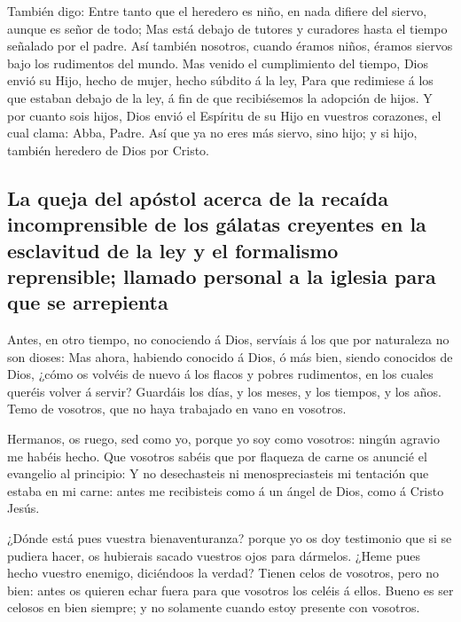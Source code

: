 También digo: Entre tanto que el heredero es niño, en
nada difiere del siervo, aunque es señor de todo;  Mas
está debajo de tutores y curadores hasta el tiempo señalado por el
padre.  Así también nosotros, cuando éramos niños, éramos
siervos bajo los rudimentos del mundo.  Mas venido el
cumplimiento del tiempo, Dios envió su Hijo, hecho de mujer, hecho
súbdito á la ley,  Para que redimiese á los que estaban
debajo de la ley, á fin de que recibiésemos la adopción de hijos.
 Y por cuanto sois hijos, Dios envió el Espíritu de su
Hijo en vuestros corazones, el cual clama: Abba, Padre. 
Así que ya no eres más siervo, sino hijo; y si hijo, también heredero de
Dios por Cristo.

\hypertarget{la-queja-del-apuxf3stol-acerca-de-la-recauxedda-incomprensible-de-los-guxe1latas-creyentes-en-la-esclavitud-de-la-ley-y-el-formalismo-reprensible-llamado-personal-a-la-iglesia-para-que-se-arrepienta}{%
\subsection{La queja del apóstol acerca de la recaída incomprensible de
los gálatas creyentes en la esclavitud de la ley y el formalismo
reprensible; llamado personal a la iglesia para que se
arrepienta}\label{la-queja-del-apuxf3stol-acerca-de-la-recauxedda-incomprensible-de-los-guxe1latas-creyentes-en-la-esclavitud-de-la-ley-y-el-formalismo-reprensible-llamado-personal-a-la-iglesia-para-que-se-arrepienta}}

 Antes, en otro tiempo, no conociendo á Dios, servíais á
los que por naturaleza no son dioses:  Mas ahora, habiendo
conocido á Dios, ó más bien, siendo conocidos de Dios, ¿cómo os volvéis
de nuevo á los flacos y pobres rudimentos, en los cuales queréis volver
á servir?  Guardáis los días, y los meses, y los tiempos,
y los años.  Temo de vosotros, que no haya trabajado en
vano en vosotros.

 Hermanos, os ruego, sed como yo, porque yo soy como
vosotros: ningún agravio me habéis hecho.  Que vosotros
sabéis que por flaqueza de carne os anuncié el evangelio al principio:
 Y no desechasteis ni menospreciasteis mi tentación que
estaba en mi carne: antes me recibisteis como á un ángel de Dios, como á
Cristo Jesús.

 ¿Dónde está pues vuestra bienaventuranza? porque yo os
doy testimonio que si se pudiera hacer, os hubierais sacado vuestros
ojos para dármelos.  ¿Heme pues hecho vuestro enemigo,
diciéndoos la verdad?  Tienen celos de vosotros, pero no
bien: antes os quieren echar fuera para que vosotros los celéis á ellos.
 Bueno es ser celosos en bien siempre; y no solamente
cuando estoy presente con vosotros.

